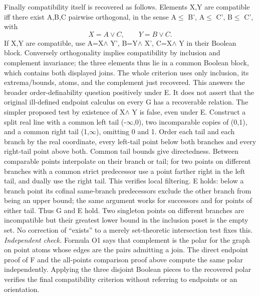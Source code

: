 Finally compatibility itself is recovered as follows. Elements X,Y are compatible iff there exist A,B,C pairwise orthogonal, in the sense A$\leq$ B', A$\leq$ C', B$\leq$ C', with
\[X=A\vee C,\qquad Y=B\vee C.\]
If X,Y are compatible, use A=X$\wedge$ Y', B=Y$\wedge$ X', C=X$\wedge$ Y in their Boolean block. Conversely orthogonality implies compatibility by inclusion and complement invariance; the three elements thus lie in a common Boolean block, which contains both displayed joins. The whole criterion uses only inclusion, its extrema/bounds, atoms, and the complement just recovered. This answers the broader order-definability question positively under E. It does not assert that the original ill-defined endpoint calculus on every G has a recoverable relation.
The simpler proposed test by existence of X$\wedge$ Y is false, even under E. Construct a split real line with a common left tail (-$\infty$,0), two incomparable copies of (0,1), and a common right tail (1,$\infty$), omitting 0 and 1. Order each tail and each branch by the real coordinate, every left-tail point below both branches and every right-tail point above both. Common tail bounds give directedness. Between comparable points interpolate on their branch or tail; for two points on different branches with a common strict predecessor use a point farther right in the left tail, and dually use the right tail. This verifies local filtering. E holds: below a branch point its cofinal same-branch predecessors exclude the other branch from being an upper bound; the same argument works for successors and for points of either tail. Thus G and E hold. Two singleton points on different branches are incompatible but their greatest lower bound in the inclusion poset is the empty set. No correction of ``exists'' to a merely set-theoretic intersection test fixes this.
\emph{Independent check.} Formula O1 says that complement is the polar for the graph on point atoms whose edges are the pairs admitting a join. The direct endpoint proof of F and the all-points comparison proof above compute the same polar independently. Applying the three disjoint Boolean pieces to the recovered polar verifies the final compatibility criterion without referring to endpoints or an orientation.

